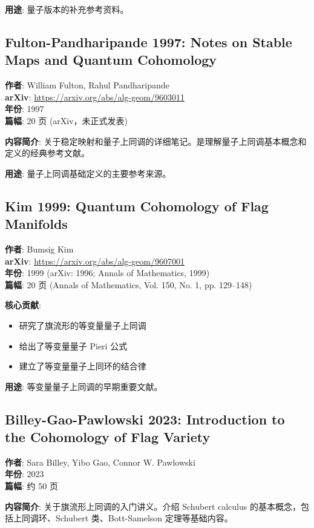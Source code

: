 \textbf{用途}: 量子版本的补充参考资料。

\subsection{Fulton-Pandharipande 1997: Notes on Stable Maps and Quantum Cohomology}
\textbf{作者}: William Fulton, Rahul Pandharipande \\
\textbf{arXiv}: \url{https://arxiv.org/abs/alg-geom/9603011} \\
\textbf{年份}: 1997 \\
\textbf{篇幅}: 20 页 (arXiv，未正式发表)

\textbf{内容简介}: 关于稳定映射和量子上同调的详细笔记。是理解量子上同调基本概念和定义的经典参考文献。

\textbf{用途}: 量子上同调基础定义的主要参考来源。

\subsection{Kim 1999: Quantum Cohomology of Flag Manifolds}
\textbf{作者}: Bumsig Kim \\
\textbf{arXiv}: \url{https://arxiv.org/abs/alg-geom/9607001} \\
\textbf{年份}: 1999 (arXiv: 1996; Annals of Mathematics, 1999) \\
\textbf{篇幅}: 20 页 (Annals of Mathematics, Vol. 150, No. 1, pp. 129--148)

\textbf{核心贡献}:
\begin{itemize}
\item 研究了旗流形的等变量量子上同调
\item 给出了等变量量子 Pieri 公式
\item 建立了等变量量子上同环的结合律
\end{itemize}

\textbf{用途}: 等变量量子上同调的早期重要文献。

\subsection{Billey-Gao-Pawlowski 2023: Introduction to the Cohomology of Flag Variety}
\textbf{作者}: Sara Billey, Yibo Gao, Connor W. Pawlowski \\
\textbf{年份}: 2023 \\
\textbf{篇幅}: 约 50 页

\textbf{内容简介}: 关于旗流形上同调的入门讲义。介绍 Schubert  calculus 的基本概念，包括上同调环、Schubert 类、Bott-Samelson 定理等基础内容。

